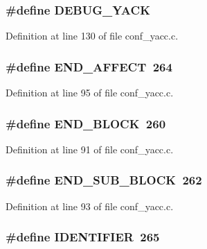 \subsubsection[{DEBUG\_\-YACK}]{\setlength{\rightskip}{0pt plus 5cm}\#define DEBUG\_\-YACK}\label{conf__yacc_8c_2c1ac69cdb2da00dbefd1fe0e971e08c}




Definition at line 130 of file conf\_\-yacc.c.
\subsubsection[{END\_\-AFFECT}]{\setlength{\rightskip}{0pt plus 5cm}\#define END\_\-AFFECT~264}\label{conf__yacc_8c_118bfcf86c66a3e14247675e6eb0e336}




Definition at line 95 of file conf\_\-yacc.c.
\subsubsection[{END\_\-BLOCK}]{\setlength{\rightskip}{0pt plus 5cm}\#define END\_\-BLOCK~260}\label{conf__yacc_8c_1e33ae802796dae8694948b87ac62d61}




Definition at line 91 of file conf\_\-yacc.c.
\subsubsection[{END\_\-SUB\_\-BLOCK}]{\setlength{\rightskip}{0pt plus 5cm}\#define END\_\-SUB\_\-BLOCK~262}\label{conf__yacc_8c_73651ad88c3904ffeed68fc6d15c88ff}




Definition at line 93 of file conf\_\-yacc.c.
\subsubsection[{IDENTIFIER}]{\setlength{\rightskip}{0pt plus 5cm}\#define IDENTIFIER~265}\label{conf__yacc_8c_45734d64ac1283048289925ad7b30dfe}




